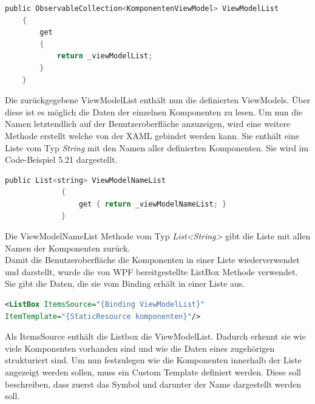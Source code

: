 \begin{lstlisting}[language=C,
    frame=single,           % Ein Rahmen um den Code
    framexleftmargin=15pt,  % Rahmen link von den Zahlen
    style=algoBericht,
    label={viewModelList},
    captionpos=b,           % Caption unter den Code setzen
    caption={viewModelList}]
    public ObservableCollection<KomponentenViewModel> ViewModelList
    {
        get
        {
            return _viewModelList;
        }
    }
\end{lstlisting}
Die zurückgegebene ViewModelList enthält nun die definierten ViewModels. Über diese ist es möglich die Daten der einzelnen Komponenten zu lesen. Um nun die Namen letztendlich auf der Benutzeroberfläche anzuzeigen, wird eine weitere Methode erstellt welche von der XAML gebindet werden kann. Sie enthält eine Liste vom Typ \textit{String} mit den Namen aller definierten Komponenten. Sie wird im Code-Beispiel 5.21 dargestellt.
\begin{lstlisting}[language=C,
    frame=single,           % Ein Rahmen um den Code
    framexleftmargin=15pt,  % Rahmen link von den Zahlen
    style=algoBericht,
    label={viewModelNameList},
    captionpos=b,           % Caption unter den Code setzen
    caption={viewModelNameList}]
    public List<string> ViewModelNameList
             {
                 get { return _viewModelNameList; }
             } 
\end{lstlisting}
Die ViewModelNameList Methode vom Typ \textit{List<String>} gibt die Liste mit allen Namen der Komponenten zurück. 
\\
Damit die Benutzeroberfläche die Komponenten in einer Liste wiederverwendet und darstellt, wurde die von WPF bereitgestellte ListBox Methode verwendet. Sie gibt die Daten, die sie vom Binding erhält in einer Liste aus.
\begin{lstlisting}[language=XML,
    frame=single,           % Ein Rahmen um den Code
    framexleftmargin=15pt,  % Rahmen link von den Zahlen
    style=algoBericht,
    label={komponentenToolsView},
    captionpos=b,           % Caption unter den Code setzen
caption={KomponentenToolsView XAML-Code}]
<ListBox ItemsSource="{Binding ViewModelList}" 
ItemTemplate="{StaticResource komponenten}"/>
\end{lstlisting}
Als ItemsSource enthält die Listbox die ViewModelList. Dadurch erkennt sie wie viele Komponenten vorhanden sind und wie die Daten eines zugehörigen strukturiert sind. Um nun festzulegen wie die Komponenten innerhalb der Liste angezeigt werden sollen, muss ein Custom Template definiert werden. Diese soll beschreiben, dass zuerst das Symbol und darunter der Name dargestellt werden soll.  
